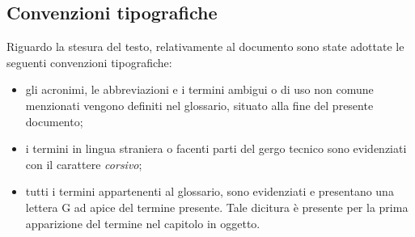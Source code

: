 \subsection{Convenzioni tipografiche}\label{sec:convenzioni-tipografiche}
Riguardo la stesura del testo, relativamente al documento sono state adottate le seguenti convenzioni tipografiche:
\begin{itemize}
	\item gli acronimi, le abbreviazioni e i termini ambigui o di uso non comune menzionati vengono definiti nel glossario, situato alla fine del presente documento;
	\item i termini in lingua straniera o facenti parti del gergo tecnico sono evidenziati con il carattere \emph{corsivo};
	\item tutti i termini appartenenti al glossario, sono evidenziati e presentano una lettera G ad apice del termine presente. Tale dicitura è presente per la prima apparizione del termine nel capitolo in oggetto. 
\end{itemize}

